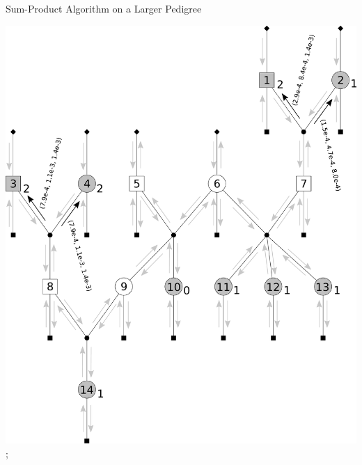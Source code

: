 \documentclass[letter,graphicx]{beamer}
\begin{document}
\begin{frame}{Sum-Product Algorithm on a Larger Pedigree} 
\begin{center} 
\includegraphics[height = 0.8\textheight]{./images/mg-example-step11.pdf}; 
\end{center}
\end{frame}
\end{document}
